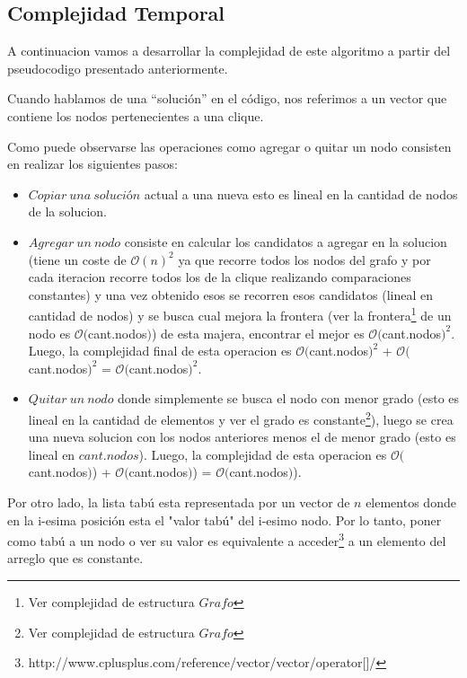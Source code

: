 \subsection{Complejidad Temporal}

 A continuacion vamos a desarrollar la complejidad de este algoritmo a partir del pseudocodigo presentado anteriormente. \newline

 Cuando hablamos de una ``solución'' en el código, nos referimos a un vector que contiene los nodos pertenecientes a una clique. \newline

 Como puede observarse las operaciones como agregar o quitar un nodo consisten en realizar los siguientes pasos: \newline
\begin{itemize}
 \item $Copiar\ una\ solución$ actual a una nueva esto es lineal en la cantidad de nodos de la solucion.
 \item $Agregar\ un\ nodo$ consiste en calcular los candidatos a agregar en la solucion (tiene un coste de $\mathcal{O}(n)^{2}$ ya que recorre todos los nodos del grafo y por cada iteracion recorre todos los de la clique realizando comparaciones constantes) y una vez obtenido esos se recorren esos candidatos (lineal en cantidad de nodos) y se busca cual mejora la frontera (ver la frontera\footnote{Ver complejidad de estructura $Grafo$} de un nodo es $\mathcal{O}($cant.nodos$)$) de esta majera, encontrar el mejor es $\mathcal{O}($cant.nodos$)^{2}$. Luego, la complejidad final de esta operacion es $\mathcal{O}($cant.nodos$)^{2}$ + $\mathcal{O}($cant.nodos$)^{2}$ = $\mathcal{O}($cant.nodos$)^{2}$.
 \item $Quitar\ un\ nodo$ donde simplemente se busca el nodo con menor grado (esto es lineal en la cantidad de elementos y ver el grado es constante\footnote{Ver complejidad de estructura $Grafo$}), luego se crea una nueva solucion con los nodos anteriores menos el de menor grado (esto es lineal en $cant.nodos$). Luego, la complejidad de esta operacion es $\mathcal{O}($cant.nodos$)$) + $\mathcal{O}($cant.nodos$)$) = $\mathcal{O}($cant.nodos$)$).
\end{itemize}

 Por otro lado, la lista tabú esta representada por un vector de $n$ elementos donde en la i-esima posición esta el "valor tabú" del i-esimo nodo. Por lo tanto, poner como tabú a un nodo o ver su valor es equivalente a acceder\footnote{http://www.cplusplus.com/reference/vector/vector/operator[]/} a un elemento del arreglo que es constante.\newline

